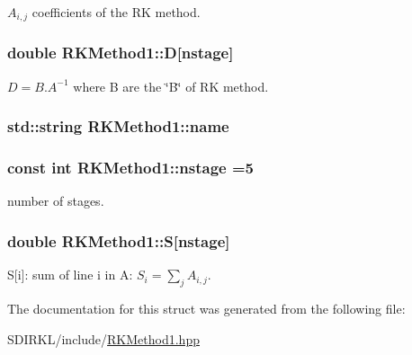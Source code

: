 $ A_{i,j}$ coefficients of the R\-K method. 

\hypertarget{structRKMethod1_a30390120c364f0c0691c355a9a7c0950}{
\subsubsection[{D}]{\setlength{\rightskip}{0pt plus 5cm}double R\-K\-Method1\-::\-D\mbox{[}{\bf nstage}\mbox{]}}}\label{structRKMethod1_a30390120c364f0c0691c355a9a7c0950}


$ D= B.A^{-1} $ where B are the \char`\"{}\-B\char`\"{} of R\-K method. 

\hypertarget{structRKMethod1_a04a57de1e4be2c564f267bad3cc04f62}{
\subsubsection[{name}]{\setlength{\rightskip}{0pt plus 5cm}std\-::string R\-K\-Method1\-::name}}\label{structRKMethod1_a04a57de1e4be2c564f267bad3cc04f62}
\hypertarget{structRKMethod1_a60cd377e618300470e679691c7f8a924}{
\subsubsection[{nstage}]{\setlength{\rightskip}{0pt plus 5cm}const int R\-K\-Method1\-::nstage =5\hspace{0.3cm}{\ttfamily [static]}}}\label{structRKMethod1_a60cd377e618300470e679691c7f8a924}


number of stages. 

\hypertarget{structRKMethod1_afce9377a7835fb7cccacf55ac1c10c4d}{
\subsubsection[{S}]{\setlength{\rightskip}{0pt plus 5cm}double R\-K\-Method1\-::\-S\mbox{[}{\bf nstage}\mbox{]}}}\label{structRKMethod1_afce9377a7835fb7cccacf55ac1c10c4d}


S\mbox{[}i\mbox{]}\-: sum of line i in A\-: $ S_i= \sum_j A_{i,j}$. 



The documentation for this struct was generated from the following file\-:\begin{DoxyCompactItemize}
\item 
S\-D\-I\-R\-K\-L/include/\hyperlink{RKMethod1_8hpp}{R\-K\-Method1.\-hpp}\end{DoxyCompactItemize}
